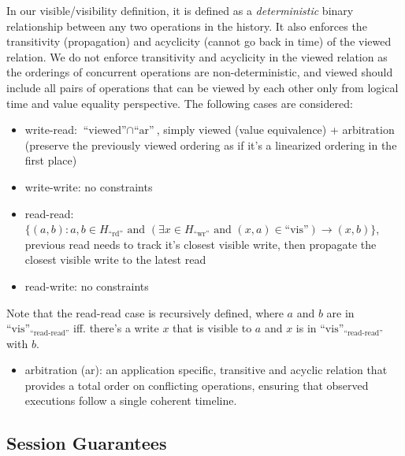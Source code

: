 In our visible/visibility definition, it is defined as a
\textit{deterministic} binary
relationship between any two operations in the history. It also enforces the
transitivity (propagation) and acyclicity (cannot go back in time) of the viewed
relation. We do not enforce transitivity and acyclicity in the viewed relation
as the orderings of concurrent operations are non-deterministic, and viewed
should include all pairs of operations that can be viewed by each other only
from logical time and value equality perspective. The following cases are
considered:

\begin{itemize}
  \item write-read: $\text{``viewed''} \cap \text{``ar''}$, simply
    viewed (value equivalence) +
    arbitration (preserve the previously viewed ordering as if it's a linearized
    ordering in the first place)

  \item write-write: no constraints
\end{itemize}

\begin{itemize}
  \item read-read: $\{(a, b) : a, b \in H_\text{``rd''} \text{ and }
      (\exists x \in H_\text{``wr''} \text{ and } (x, a) \in
    \text{``vis''}) \rightarrow (x, b)\}$,
    previous read needs to track it's closest visible write, then propagate the
    closest visible write to the latest read

  \item read-write: no constraints
\end{itemize}

Note that the read-read case is recursively defined, where $a$ and
$b$ are in $\text{``vis''}_\text{``read-read''}$ iff.
there's a write $x$ that is visible to $a$ and $x$ is in
$\text{``vis''}_\text{``read-read''}$ with $b$.

\begin{itemize}
  \item arbitration (ar): an application specific, transitive and
    acyclic relation that
    provides a total order on conflicting operations, ensuring that observed
    executions follow a single coherent timeline.
\end{itemize}

\subsection{Session Guarantees}

